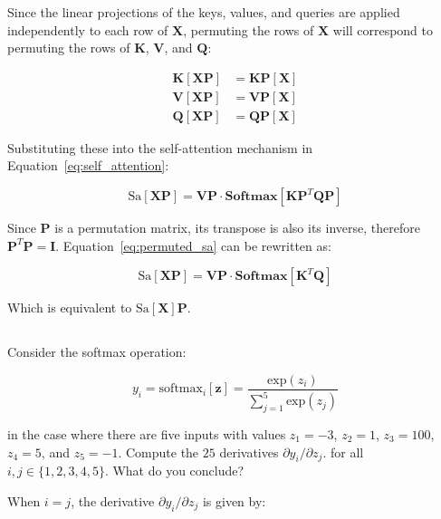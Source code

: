 \documentclass[12pt]{report}
\begin{document}
Since the linear projections of the keys, values, and queries are applied independently to each row of $\mathbf{X}$, permuting the rows of $\mathbf{X}$ will correspond to permuting the rows of $\mathbf{K}$, $\mathbf{V}$, and $\mathbf{Q}$:

\begin{align}
    \mathbf{K[XP]} & = \mathbf{KP[X]} \\
    \mathbf{V[XP]} & = \mathbf{VP[X]} \\
    \mathbf{Q[XP]} & = \mathbf{QP[X]}
\end{align}

Substituting these into the self-attention mechanism in Equation~\eqref{eq:self_attention}:

\begin{equation}
    \text{Sa}[\mathbf{XP}] = \mathbf{VP} \cdot \mathbf{Softmax}[\mathbf{KP}^{T}\mathbf{QP}]
    \label{eq:permuted_sa}
\end{equation}

Since $\mathbf{P}$ is a permutation matrix, its transpose is also its inverse, therefore $\mathbf{P}^{T}\mathbf{P} = \mathbf{I}$. Equation~\eqref{eq:permuted_sa} can be rewritten as:

\begin{equation}
    \text{Sa}[\mathbf{XP}] = \mathbf{VP} \cdot \mathbf{Softmax}[\mathbf{K}^{T}\mathbf{Q}]
\end{equation}

Which is equivalent to $\text{Sa}[\mathbf{X}]\mathbf{P}$.

\newpage

\subsection{}
\begin{mdframed}
    Consider the softmax operation:

    \begin{equation*}
        y_{i} = \text{softmax}_{i}[\mathbf{z}] = \frac{\text{exp}(z_{i})}{\sum_{j=1}^{5}\text{exp}(z_{j})}
    \end{equation*}

    in the case where there are five inputs with values $z_{1} = -3$, $z_{2} = 1$, $z_{3} = 100$, $z_{4} = 5$, and $z_{5} = -1$. Compute the $25$ derivatives $\partial y_{i}/\partial z_{j}$. for all $i, j \in \{1,2,3,4,5\}$. What do you conclude?
\end{mdframed}

When $i = j$, the derivative $\partial y_{i}/\partial z_{j}$ is given by:
\end{document}
